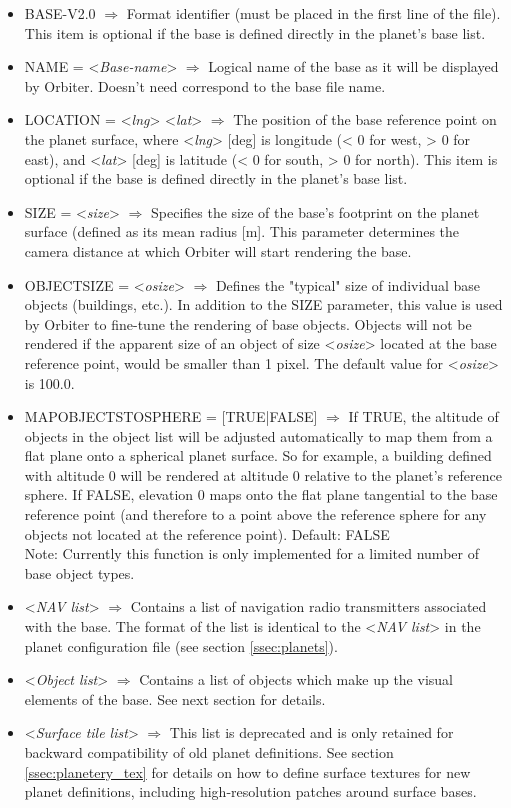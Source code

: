\documentclass[Orbiter Developer Manual.tex]{subfiles}
\begin{document}
\begin{itemize}
\item BASE-V2.0 $\Rightarrow$ Format identifier (must be placed in the first line of the file). This item is optional if the base is defined directly in the planet's base list.
\item NAME = <\textit{Base-name}> $\Rightarrow$ Logical name of the base as it will be displayed by Orbiter. Doesn't need correspond to the base file name.
\item LOCATION = <\textit{lng}> <\textit{lat}> $\Rightarrow$ The position of the base reference point on the planet surface, where <\textit{lng}> [deg] is longitude (< 0 for west, > 0 for east), and <\textit{lat}> [deg] is latitude (< 0 for south, > 0 for north). This item is optional if the base is defined directly in the planet's base list.
\item SIZE = <\textit{size}> $\Rightarrow$ Specifies the size of the base's footprint on the planet surface (defined as its mean radius [m]. This parameter determines the camera distance at which Orbiter will start rendering the base.
\item OBJECTSIZE = <\textit{osize}> $\Rightarrow$ Defines the "typical" size of individual base objects (buildings, etc.). In addition to the SIZE parameter, this value is used by Orbiter to fine-tune the rendering of base objects. Objects will not be rendered if the apparent size of an object of size <\textit{osize}> located at the base reference point, would be smaller than 1 pixel. The default value for <\textit{osize}> is 100.0.
\item MAPOBJECTSTOSPHERE = [TRUE|FALSE] $\Rightarrow$ If TRUE, the altitude of objects in the object list will be adjusted automatically to map them from a flat plane onto a spherical planet surface. So for example, a building defined with altitude 0 will be rendered at altitude 0 relative to the planet's reference sphere. If FALSE, elevation 0 maps onto the flat plane tangential to the base reference point (and therefore to a point above the reference sphere for any objects not located at the reference point). Default: FALSE\\
Note: Currently this function is only implemented for a limited number of base object types.
\item <\textit{NAV list}> $\Rightarrow$ Contains a list of navigation radio transmitters associated with the base. The format of the list is identical to the <\textit{NAV list}> in the planet configuration file (see section \ref{ssec:planets}).
\item <\textit{Object list}> $\Rightarrow$ Contains a list of objects which make up the visual elements of the base. See next section for details.
\item <\textit{Surface tile list}> $\Rightarrow$ This list is deprecated and is only retained for backward compatibility of old planet definitions. See section \ref{ssec:planetery_tex} for details on how to define surface textures for new planet definitions, including high-resolution patches around surface bases.
\end{itemize}
\end{document}
